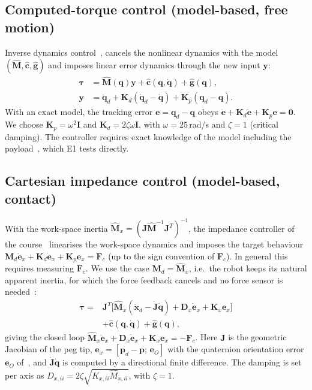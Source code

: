 \documentclass[conference]{IEEEtran}
\newcommand{\bq}{\boldsymbol{q}}
\newcommand{\dq}{\dot{\boldsymbol{q}}}
\newcommand{\ddq}{\ddot{\boldsymbol{q}}}
\newcommand{\btau}{\boldsymbol{\tau}}
\newcommand{\bx}{\boldsymbol{x}}
\newcommand{\be}{\boldsymbol{e}}
\newcommand{\bM}{\boldsymbol{M}}
\newcommand{\bJ}{\boldsymbol{J}}
\newcommand{\bK}{\boldsymbol{K}}
\newcommand{\bD}{\boldsymbol{D}}
\newcommand{\bF}{\boldsymbol{F}}
\newcommand{\bc}{\boldsymbol{c}}
\newcommand{\bg}{\boldsymbol{g}}
\begin{document}
\subsection{Computed-torque control (model-based, free motion)}
Inverse dynamics control~\cite[Sec.~8.5.2]{siciliano2009},\cite{carloni2026} cancels the nonlinear dynamics with the model $(\hat{\bM},\hat{\bc},\hat{\bg})$ and imposes linear error dynamics through the new input $\boldsymbol{y}$:
\begin{align}
\btau &= \hat{\bM}(\bq)\boldsymbol{y} + \hat{\bc}(\bq,\dq) + \hat{\bg}(\bq),\\
\boldsymbol{y} &= \ddq_d + \bK_d(\dq_d-\dq) + \bK_p(\bq_d-\bq).
\end{align}
With an exact model, the tracking error $\be=\bq_d-\bq$ obeys $\ddot{\be}+\bK_d\dot{\be}+\bK_p\be=\boldsymbol{0}$. We choose $\bK_p=\omega^2\boldsymbol{I}$ and $\bK_d=2\zeta\omega\boldsymbol{I}$, with $\omega=25$\,rad/s and $\zeta=1$ (critical damping). The controller requires exact knowledge of the model including the payload~\cite{carloni2026}, which E1 tests directly.

\subsection{Cartesian impedance control (model-based, contact)}
With the work-space inertia $\hat{\bM}_x=(\bJ\hat{\bM}^{-1}\bJ^T)^{-1}$, the impedance controller of the course~\cite{carloni2026} linearises the work-space dynamics and imposes the target behaviour $\bM_d\ddot{\be}_x+\bK_d\dot{\be}_x+\bK_p\be_x=\bF_c$ (up to the sign convention of $\bF_c$). In general this requires measuring $\bF_c$. We use the case $\bM_d=\hat{\bM}_x$, i.e.\ the robot keeps its natural apparent inertia, for which the force feedback cancels and no force sensor is needed~\cite{khatib1987,ott2008}:
\begin{equation}
\begin{split}
\btau = {}&\bJ^T\!\big[\hat{\bM}_x(\ddot{\bx}_d-\dot{\bJ}\dq) + \bD_x\dot{\be}_x + \bK_x\be_x\big]\\
&+ \hat{\bc}(\bq,\dq) + \hat{\bg}(\bq),
\end{split}
\label{eq:imp}
\end{equation}
giving the closed loop $\hat{\bM}_x\ddot{\be}_x+\bD_x\dot{\be}_x+\bK_x\be_x=-\bF_c$. Here $\bJ$ is the geometric Jacobian of the peg tip, $\be_x=[\boldsymbol{p}_d-\boldsymbol{p};\,\be_O]$ with the quaternion orientation error $\be_O$ of~\cite[Eq.~3.91]{siciliano2009}, and $\dot{\bJ}\dq$ is computed by a directional finite difference. The damping is set per axis as $D_{x,ii}=2\zeta\sqrt{K_{x,ii}\hat{M}_{x,ii}}$, with $\zeta=1$.
\end{document}
